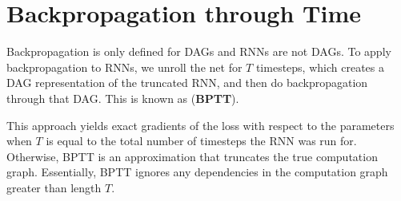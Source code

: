 \section{Backpropagation through Time}\label{sec:recurrent_neural_nets:bptt}
Backpropagation is only defined for DAGs and RNNs are not DAGs. To apply backpropagation to RNNs, we unroll the net for $T$ timesteps, which creates a DAG representation of the truncated RNN, and then do backpropagation through that DAG. This is known as  ({\bf BPTT}). 

This approach yields exact gradients of the loss with respect to the parameters when $T$ is equal to the total number of timesteps the RNN was run for. Otherwise, BPTT is an approximation that truncates the true computation graph. Essentially, BPTT ignores any dependencies in the computation graph greater than length $T$.

